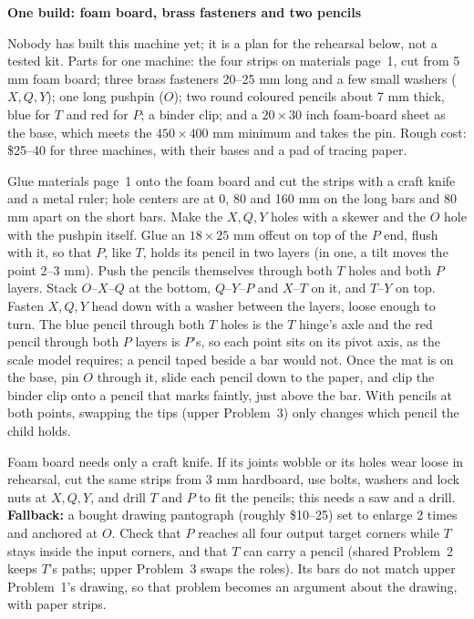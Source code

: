 \documentclass[11pt,letterpaper]{article}
\newcommand{\sub}[1]{\par\textbf{#1}\par}
\begin{document}
\sub{One build: foam board, brass fasteners and two pencils}
Nobody has built this machine yet; it is a plan for the rehearsal below, not a tested kit. Parts for one machine: the four strips on materials page~1, cut from 5 mm foam board; three brass fasteners 20--25 mm long and a few small washers ($X,Q,Y$); one long pushpin ($O$); two round coloured pencils about 7 mm thick, blue for $T$ and red for $P$; a binder clip; and a $20\times30$ inch foam-board sheet as the base, which meets the $450\times400$ mm minimum and takes the pin. Rough cost: \$25--40 for three machines, with their bases and a pad of tracing paper.

Glue materials page~1 onto the foam board and cut the strips with a craft knife and a metal ruler; hole centers are at 0, 80 and 160 mm on the long bars and 80 mm apart on the short bars. Make the $X,Q,Y$ holes with a skewer and the $O$ hole with the pushpin itself. Glue an $18\times25$ mm offcut on top of the $P$ end, flush with it, so that $P$, like $T$, holds its pencil in two layers (in one, a tilt moves the point 2--3 mm). Push the pencils themselves through both $T$ holes and both $P$ layers. Stack $O$--$X$--$Q$ at the bottom, $Q$--$Y$--$P$ and $X$--$T$ on it, and $T$--$Y$ on top. Fasten $X,Q,Y$ head down with a washer between the layers, loose enough to turn. The blue pencil through both $T$ holes is the $T$ hinge's axle and the red pencil through both $P$ layers is $P$'s, so each point sits on its pivot axis, as the scale model requires; a pencil taped beside a bar would not. Once the mat is on the base, pin $O$ through it, slide each pencil down to the paper, and clip the binder clip onto a pencil that marks faintly, just above the bar. With pencils at both points, swapping the tips (upper Problem~3) only changes which pencil the child holds.

Foam board needs only a craft knife. If its joints wobble or its holes wear loose in rehearsal, cut the same strips from 3 mm hardboard, use bolts, washers and lock nuts at $X,Q,Y$, and drill $T$ and $P$ to fit the pencils; this needs a saw and a drill. \textbf{Fallback:} a bought drawing pantograph (roughly \$10--25) set to enlarge 2 times and anchored at $O$. Check that $P$ reaches all four output target corners while $T$ stays inside the input corners, and that $T$ can carry a pencil (shared Problem~2 keeps $T$'s paths; upper Problem~3 swaps the roles). Its bars do not match upper Problem~1's drawing, so that problem becomes an argument about the drawing, with paper strips.
\end{document}
